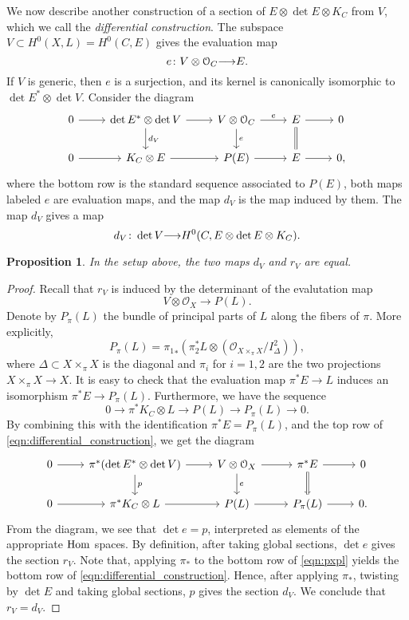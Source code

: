\documentclass[11pt,reqno]{amsart}
\theoremstyle{plain}
\newtheorem{proposition}[theorem]{Proposition}
\theoremstyle{definition}
\theoremstyle{remark}
\numberwithin{equation}{section}
\renewcommand{\to}{{\longrightarrow}}
\numberwithin{equation}{section}
\renewcommand{\O}{\mathcal O}
\begin{document}
We now describe another construction of a section of $E \otimes \det E \otimes K_C$ from $V$, which we call the \emph{differential construction}.
The subspace $V \subset H^0(X, L) = H^0(C, E)$ gives the evaluation map
\[ e \from V \otimes \O_C \to E.\]
If $V$ is generic, then $e$ is a surjection, and its kernel is canonically isomorphic to $\det E^* \otimes \det V$.
Consider the diagram
\begin{equation}\label{eqn:differential_construction}
\begin{tikzcd}
  0 \arrow{r}& \det E^* \otimes \det V \arrow{r}\arrow{d}{d_V}& V \otimes \O_C \arrow{r}{e}\arrow{d}{e}& E \arrow{r}\arrow[equal]{d}& 0 \\
  0 \arrow{r}& K_C \otimes E \arrow{r}& P(E) \arrow{r}& E \arrow{r}& 0,
\end{tikzcd}
\end{equation}
where the bottom row is the standard sequence associated to $P(E)$, both maps labeled $e$ are evaluation maps, and the map $d_V$ is the map induced by them.
The map $d_V$ gives a map
\[ d_V \from \det V \to H^0(C, E \otimes \det E \otimes K_C).\]
\begin{proposition}\label{prop:rdv}
  In the setup above, the two maps $d_V$ and $r_V$ are equal.
\end{proposition}
\begin{proof}
  Recall that $r_V$ is induced by the determinant of the evalutation map
  \[ V \otimes \O_X \to P(L).\]
  Denote by $P_\pi(L)$ the bundle of principal parts of $L$ along the fibers of $\pi$.
  More explicitly,
  \[ P_\pi(L) = {\pi_1}_* \left(\pi_2^* L \otimes \left(\O_{X \times_\pi X} / I_{\Delta}^2\right)\right),\]
  where $\Delta \subset X \times_\pi X$ is the diagonal and $\pi_i$ for $i = 1,2$ are the two projections $X \times_\pi X \to X$.
  It is easy to check that the evaluation map $\pi^* E \to L$ induces an isomorphism $\pi^* E \to P_\pi(L)$.
  Furthermore, we have the sequence
  \[ 0 \to \pi^* K_C \otimes L \to P(L) \to P_\pi(L) \to 0.\]
  By combining this with the identification $\pi^* E = P_\pi(L)$, and the top row of \eqref{eqn:differential_construction}, we get the diagram
  \begin{equation}\label{eqn:pxpl}
    \begin{tikzcd}
      0 \arrow{r}& \pi^*(\det E^* \otimes \det V) \arrow{r}\arrow{d}{p}& V \otimes \O_X \arrow{r}\arrow{d}{e}& \pi^* E \arrow{r}\arrow{d}\arrow[equal]{d}& 0\\
      0 \arrow{r}& \pi^* K_C \otimes L \arrow{r}& P(L) \arrow{r}& P_\pi(L) \arrow{r}& 0.
    \end{tikzcd}
  \end{equation}
  From the diagram, we see that $\det e = p$, interpreted as elements of the appropriate $\operatorname{Hom}$ spaces.
  By definition, after taking global sections, $\det e$ gives the section $r_V$.
  Note that, applying $\pi_*$ to the bottom row of \eqref{eqn:pxpl} yields the bottom row of \eqref{eqn:differential_construction}.
  Hence, after applying $\pi_*$, twisting by $\det E$ and taking global sections, $p$ gives the section $d_V$.
  We conclude that $r_V = d_V$.
\end{proof}
\end{document}
